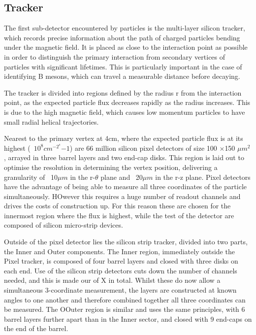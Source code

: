 \subsection{Tracker}



The first sub-detector encountered by particles is the multi-layer silicon tracker, which records precise information about the path of charged particles bending under the magnetic field. It is placed as close to the interaction point as possible in order to distinguish the primary interaction from secondary vertices of particles with significant lifetimes. This is particularly important in the case of identifying B mesons, which can travel a measurable distance before decaying.  

The tracker is divided into regions defined by the radius r from the interaction point, as the expected particle flux decreases rapidly as the radius increases. This is due to the high magnetic field, which causes low momentum particles to have small radial helical trajectories.

Nearest to the primary vertex at 4cm, where the expected particle flux is at its highest (~$10^{8} cm^{-2}^s{-1}$) are 66 million silicon pixel detectors of size 100 $\times$150 $\mu m^{2}$, arrayed in three barrel layers and two end-cap disks. This region is laid out to optimise the resolution in determining the vertex position, delivering a granularity of ~10$\mu m$ in the r-$\theta$ plane and ~20$\mu m$ in the r-z plane. Pixel detectors have the advantage of being able to measure all three coordinates of the particle simultaneously. HOwever this requires a huge number of readout channels and drives the costs of construction up. For this reason these are chosen for the innermost region where the flux is highest, while the test of the detector are composed of silicon micro-strip devices. 

Outside of the pixel detector lies the silicon strip tracker, divided into two parts, the Inner and Outer components. The Inner region, immediately outside the Pixel tracker, is composed of four barrel layers and closed with three disks on each end. Use of the silicon strip detectors cuts down the number of channels needed, and this is made our of X in total. Whilst these do now allow a simultaneous 3-coordinate measurement, the layers are constructed at known angles to one another and therefore combined together all three coordinates can be measured. The OOuter region is similar and uses the same principles, with 6 barrel layers further apart than in the Inner sector, and closed with 9 end-caps on the end of the barrel. 



